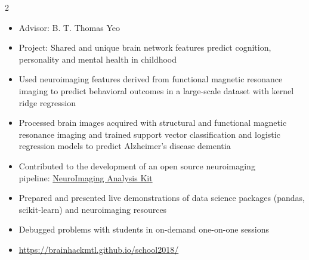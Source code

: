 \documentclass[10pt,a4paper,ragged2e,withhyper]{altacv}
\begin{document}
\begin{paracol}{2}
\divider

\begin{itemize}
    \item Advisor: B. T. Thomas Yeo
    \item Project: Shared and unique brain network features predict cognition, personality and mental health in childhood
    \item Used neuroimaging features derived from functional magnetic resonance imaging to predict behavioral outcomes in a large-scale dataset with kernel ridge regression
\end{itemize}

\divider

\begin{itemize}
    \item Processed brain images acquired with structural and functional magnetic resonance imaging and trained support vector classification and logistic regression models to predict Alzheimer's disease dementia
    \item Contributed to the development of an open source neuroimaging \\pipeline: \href{https://niak.simexp-lab.org/build/html/index.html}{NeuroImaging Analysis Kit}
\end{itemize}

\divider

\begin{itemize}
    \item Prepared and presented live demonstrations of data science packages (pandas, scikit-learn) and neuroimaging resources
    \item Debugged problems with students in on-demand one-on-one sessions
    \item \url{https://brainhackmtl.github.io/school2018/}
\end{itemize}




\end{paracol}
\end{document}
